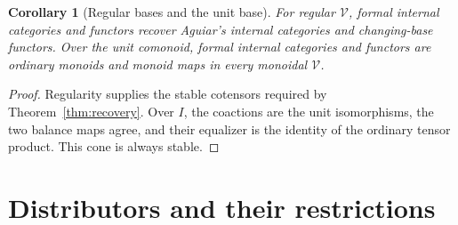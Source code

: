 \documentclass[11pt,a4paper]{article}
\newtheorem{corollary}[theorem]{Corollary}
\theoremstyle{definition}
\theoremstyle{remark}
\numberwithin{equation}{section}
\newcommand{\V}{\mathcal V}
\begin{document}
\begin{corollary}[Regular bases and the unit base]\label{cor:regular}
For regular $\V$, formal internal categories and functors recover
Aguiar's internal categories and changing-base functors. Over the unit
comonoid, formal internal categories and functors are ordinary monoids
and monoid maps in every monoidal $\V$.
\end{corollary}
\begin{proof}
Regularity supplies the stable cotensors required by
Theorem~\ref{thm:recovery}. Over $I$, the coactions are the unit
isomorphisms, the two balance maps agree, and their equalizer is the
identity of the ordinary tensor product. This cone is always stable.
\end{proof}

\section{Distributors and their restrictions}\label{sec:distributors}
\end{document}
